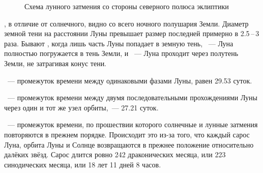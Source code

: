 \vspace{-1pc}
\begin{figure}[h!]
    \centering
    
    \caption{Схема лунного затмения со стороны северного полюса эклиптики}
    \label{fig:moon-eclipse-scheme}
\end{figure}
, в отличие от солнечного, видно со всего ночного полушария Земли. Диаметр земной тени на расстоянии Луны превышает размер последней примерно в 2.5\,--\,3 раза. Бывают , когда лишь часть Луны попадает в земную тень, ~--- Луна полностью погружается в тень Земли, и ~--- Луна проходит через полутень Земли, не затрагивая конус тени.

\begin{figure}[h!]
    \centering
    
    \caption{}
    \label{pic:eclipses-full-lunar-eslipse}
\end{figure}

\begin{figure}[h!]
    \centering
    
    \caption{}
    \label{pic:eclipses-semi-shadow-lunar-eclipse}    
\end{figure}

~--- промежуток времени между одинаковыми фазами Луны, равен 29.53 суток.

~--- промежуток времени между двумя последовательными прохождениями Луны через один и тот же узел орбиты,~--- 27.21 суток.

~--- промежуток  времени, по прошествии которого солнечные и лунные затмения повторяются в прежнем порядке. Происходит это из-за того, что каждый сарос Луна, орбита Луны и Солнце возвращаются в прежнее положение относительно далёких звёзд. Сарос длится ровно 242 драконических месяца, или 223 синодических месяца, или 18 лет 11 дней 8 часов.

